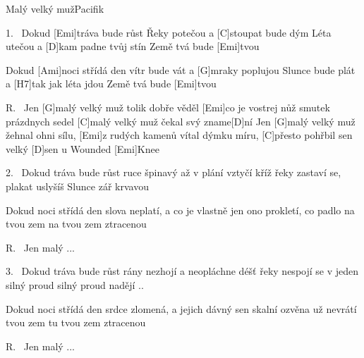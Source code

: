 \begin{song}{Malý velký muž}{Pacifik}


\begin{xverse}{1.~}
Dokud [Emi]tráva bude růst
Řeky potečou a [C]stoupat bude dým
Léta utečou a [D]kam padne tvůj stín
Země tvá bude [Emi]tvou

Dokud [Ami]noci střídá den
vítr bude vát a [G]mraky poplujou
Slunce bude plát a [H7]tak jak léta jdou
Země tvá bude [Emi]tvou
\end{xverse}


\begin{xverse}{R.~}
Jen [G]malý velký muž
tolik dobře věděl [Emi]co je vostrej nůž
smutek prázdnych sedel
[C]malý velký muž čekal svý zname[D]ní
Jen [G]malý velký muž
žehnal ohni sílu, [Emi]z rudých kamenů
vítal dýmku míru, [C]přesto pohřbil sen
velký [D]sen u Wounded [Emi]Knee
\end{xverse}


\begin{xverse}{2.~}
Dokud tráva bude růst
ruce špinavý až v plání vztyčí kříž
řeky zastaví se, plakat uslyšíš
Slunce zář krvavou

Dokud noci střídá den
slova neplatí, a co je vlastně jen
ono prokletí, co padlo na tvou zem
na tvou zem ztracenou
\end{xverse}


\begin{xverse}{R.~}
Jen malý ...
\end{xverse}

\begin{xverse}{3.~}
Dokud tráva bude růst
rány nezhojí a neopláchne déšť
řeky nespojí se v jeden silný proud
silný proud nadějí ..

Dokud noci střídá den
srdce zlomená, a jejich dávný sen
skalní ozvěna už nevrátí tvou zem
tu tvou zem ztracenou
\end{xverse}

\begin{xverse}{R.~}
Jen malý ...
\end{xverse}
\end{song}

